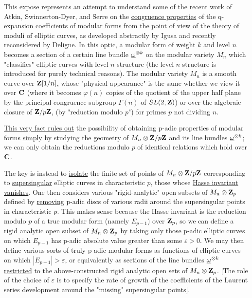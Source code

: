 \thispagestyle{plain}

This expose represents an attempt to understand some of the recent work of
Atkin, Swinnerton-Dyer, and Serre on the \uline{congruence properties} of the
q-expansion coefficients of modular forms from the point of view of the theory
of moduli of elliptic curves, as developed abstractly by Igusa and recently
reconsidered by Deligne. In this optic, a modular form of weight $k$ and level
$n$ becomes a section of a certain line bundle $\underline{\omega}^{\otimes k}$ on the modular
variety $M_n$ which "classifies" elliptic curves with level $n$ structure (the
level $n$ structure is introduced for purely technical reasons). The modular
variety $M_n$ is a smooth curve over $\mathbf{Z}[1/n]$, whose "physical appearance" is
the same whether we view it over $\mathbf{C}$ (where it becomes $\varphi(n)$ copies of
the quotient of the upper half plane by the principal congruence subgroup
$\Gamma(n)$ of $SL(2,\mathbf{Z})$) or over the algebraic closure of $\mathbf{Z}/p\mathbf{Z}$, (by
"reduction modulo $p$") for primes $p$ not dividing $n$.

\uline{This very fact rules out} the possibility of obtaining p-adic properties
of modular forms \uline{simply} by studying the geometry of
$M_n\otimes\mathbf{Z}/p\mathbf{Z}$ and its line bundles $\underline{\omega}^{\otimes k}$; we can only obtain the
reductions modulo $p$ of identical relations which hold over $\mathbf{C}$.

The key is instead to \uline{isolate} the finite set of points of
$M_n\otimes\mathbf{Z}/p\mathbf{Z}$ corresponding to \uline{supersingular} elliptic curves in
characteristic $p$, those whose \uline{Hasse invariant vanishes}. One then
considers various "rigid-analytic" open subsets of $M_n\otimes\mathbf{Z}_p$ defined by
\uline{removing} p-adic discs of various radii around the supersingular points
in characteristic $p$. This makes sense because the Hasse invariant is the
reduction modulo $p$ of a true modular form (namely $E_{p-1}$) over $\mathbf{Z}_p$, so
we can define a rigid analytic open subset of $M_n\otimes\mathbf{Z}_p$ by taking only
those p-adic elliptic curves on which $E_{p-1}$ has p-adic absolute value
greater than some $\varepsilon>0$. We may then define various sorts of truly
p-adic modular forms as functions of elliptic curves on which
$|E_{p-1}|>\varepsilon$, or equivalently as sections of the line bundles
$\underline{\omega}^{\otimes k}$ \uline{restricted} to the above-constructed rigid analytic open
sets of $M_n\otimes\mathbf{Z}_p$. [The role of the choice of $\varepsilon$ is to specify
the rate of growth of the coefficients of the Laurent series development
around the "missing" supersingular points].

